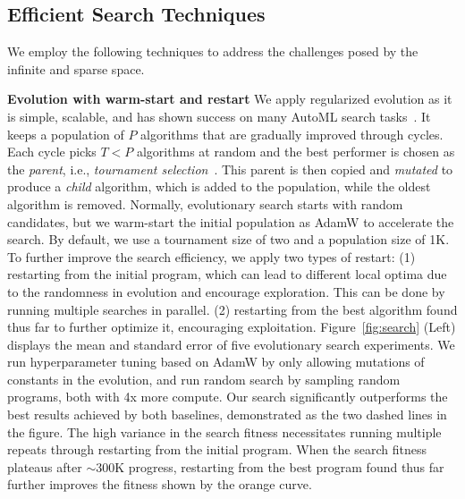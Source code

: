 \documentclass{article}
\begin{document}
\subsection{Efficient Search Techniques}
We employ the following techniques to address the challenges posed by the infinite and sparse space. 


\textbf{Evolution with warm-start and restart} 
We apply regularized evolution as it is simple, scalable, and has shown success on many AutoML search tasks~\citep{real2020automl, real2019regularized, ying2019bench, so2019evolved,holland1992adaptation}. 
It keeps a population of $P$ algorithms that are gradually improved through cycles. 
Each cycle picks $T\!\!<\!P$ algorithms at random and the best performer is chosen as the \textit{parent}, i.e., \textit{tournament selection}~\citep{goldberg1991comparative}. This parent is then copied and \textit{mutated} to produce a \textit{child} algorithm, which is added to the population, while the oldest algorithm is removed. Normally, evolutionary search starts with random candidates, but we warm-start the initial population as AdamW to accelerate the search. 
By default, we use a tournament size of two and a population size of 1K. 
To further improve the search efficiency, we apply two types of restart: (1) restarting from the initial program, which can lead to different local optima due to the randomness in evolution and encourage exploration. This can be done by running multiple searches in parallel. (2) restarting from the best algorithm found thus far to further optimize it, encouraging exploitation. 
Figure~\ref{fig:search} (Left) displays the mean and standard error of five evolutionary search experiments. We run hyperparameter tuning based on AdamW by only allowing mutations of constants in the evolution, and run random search by sampling random programs, both with 4x more compute. 
Our search significantly outperforms the best results achieved by both baselines, demonstrated as the two dashed lines in the figure. The high variance in the search fitness necessitates running multiple repeats through restarting from the initial program. When the search fitness plateaus after $\sim$300K progress, restarting from the best program found thus far further improves the fitness shown by the orange curve.


\end{document}

